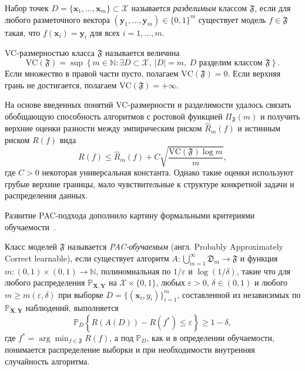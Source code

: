 \begin{definition}
    Набор точек $D = \{\mathbf{x}_1, \ldots, \mathbf{x}_m\} \subset \mathcal{X}$ называется \textit{разделимым} классом $\mathfrak{F}$, если для любого разметочного вектора $(\mathbf{y}_1,\ldots,\mathbf{y}_m) \in \{0,1\}^m$ существует модель $f \in \mathfrak{F}$ такая, что $f(\mathbf{x}_i) = \mathbf{y}_i$ для всех $i = 1,\ldots,m$.
\end{definition}

\begin{definition}[VC-размерность]
    VC-размерностью класса $\mathfrak{F}$ называется величина
    \[
        \mathrm{VC}(\mathfrak{F}) = \sup \left\{ m \in \mathbb{N} : \exists D \subset \mathcal{X},\ |D| = m,\ \text{$D$ разделим классом $\mathfrak{F}$} \right\}.
    \]
    Если множество в правой части пусто, полагаем $\mathrm{VC}(\mathfrak{F}) = 0$. Если верхняя грань не достигается, полагаем $\mathrm{VC}(\mathfrak{F}) = +\infty$.
\end{definition}
На основе введенных понятий VC-размерности и разделимости удалось связать обобщающую способность алгоритмов с ростовой функцией $\Pi_{\mathfrak{F}}(m)$ и получить верхние оценки разности между эмпирическим риском $\hat{R}_m(f)$ и истинным риском $R(f)$ вида
\[
    R(f) \leq \hat{R}_m(f) + C \sqrt{\frac{\mathrm{VC}(\mathfrak{F}) \log m}{m}},
\]
где $C > 0$ некоторая универсальная константа. Однако такие оценки используют грубые верхние границы, мало чувствительные к структуре конкретной задачи и распределения данных.

Развитие PAC-подхода дополнило картину формальными критериями обучаемости~\cite[раздел~2]{valiant1984LearnableTheory}.

\begin{definition}
    Класс моделей $\mathfrak{F}$ называется \textit{PAC-обучаемым} (англ. Probably Approximately Correct learnable), если существует алгоритм $A \colon \bigcup_{m=1}^{\infty} \mathfrak{D}_m \to \mathfrak{F}$ и функция $m \colon (0,1) \times (0,1) \to \mathbb{N}$, полиномиальная по $1/\varepsilon$ и $\log(1/\delta)$, такие что для любого распределения $\mathbb{P}_{\mathbf{X},\mathbf{Y}}$ на $\mathcal{X} \times \{0,1\}$, любых $\varepsilon > 0$, $\delta \in (0,1)$ и любого $m \geq m(\varepsilon,\delta)$ при выборке $D = \{(\mathbf{x}_i,y_i)\}_{i=1}^m$, составленной из независимых по $\mathbb{P}_{\mathbf{X},\mathbf{Y}}$ наблюдений, выполняется
    \[
        \mathbb{P}_{D}\left\{ R(A(D)) - R(f^{*}) \leq \varepsilon \right\} \geq 1 - \delta,
    \]
    где $f^{*} = \arg\min_{f \in \mathfrak{F}} R(f)$, а под $\mathbb{P}_{D}$, как и в определении обучаемости, понимается распределение выборки и при необходимости внутренняя случайность алгоритма.
\end{definition}

